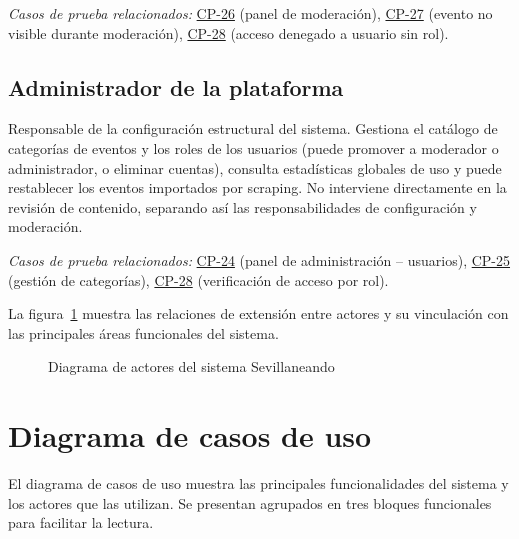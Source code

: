 \textit{Casos de prueba relacionados:} \hyperref[cp:26]{CP-26} (panel de moderación), \hyperref[cp:27]{CP-27} (evento no visible durante moderación), \hyperref[cp:28]{CP-28} (acceso denegado a usuario sin rol).

\subsection{Administrador de la plataforma}

Responsable de la configuración estructural del sistema. Gestiona el catálogo de categorías de eventos y los roles de los usuarios (puede promover a moderador o administrador, o eliminar cuentas), consulta estadísticas globales de uso y puede restablecer los eventos importados por scraping. No interviene directamente en la revisión de contenido, separando así las responsabilidades de configuración y moderación.

\textit{Casos de prueba relacionados:} \hyperref[cp:24]{CP-24} (panel de administración -- usuarios), \hyperref[cp:25]{CP-25} (gestión de categorías), \hyperref[cp:28]{CP-28} (verificación de acceso por rol).

La figura~\ref{fig:diagrama_actores} muestra las relaciones de extensión entre actores y su vinculación con las principales áreas funcionales del sistema.

\begin{figure}[H]
\centering
{}
\caption{Diagrama de actores del sistema Sevillaneando}
\label{fig:diagrama_actores}
\end{figure}

\section{Diagrama de casos de uso}

El diagrama de casos de uso muestra las principales funcionalidades del sistema y los actores que las utilizan. Se presentan agrupados en tres bloques funcionales para facilitar la lectura.


